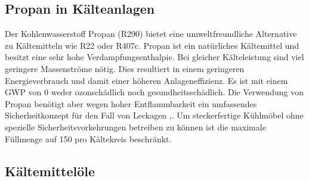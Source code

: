 \subsection{Propan in Kälteanlagen}
\label{subsec:Propan in Kälteanlagen}

Der Kohlenwasserstoff Propan (R290) bietet eine umweltfreundliche Alternative zu Kältemitteln wie R22 oder R407c. Propan ist ein natürliches Kältemittel und besitzt eine sehr hohe Verdampfungsenthalpie. Bei gleicher Kälteleistung sind viel geringere Massenströme nötig. Dies resultiert in einem geringeren Energieverbrauch und damit einer höheren Anlageneffizienz.
Es ist mit einem GWP von 0 weder ozonschädlich noch gesundheitsschädlich. Die Verwendung von Propan benötigt aber wegen hoher Entflammbarkeit ein umfassendes Sicherheitkonzept für den Fall von Leckagen \cite{BitzerKuhlmaschinenGmbH.2014},\cite{Huber.2011}.
Um steckerfertige Kühlmöbel ohne spezielle Sicherheitsvorkehrungen betreiben zu können ist die maximale Füllmenge auf \unit{150}{\gram} pro Kältekreis beschränkt.





\subsection{Kältemittelöle}
\label{subsec:Kältemittelöle}

